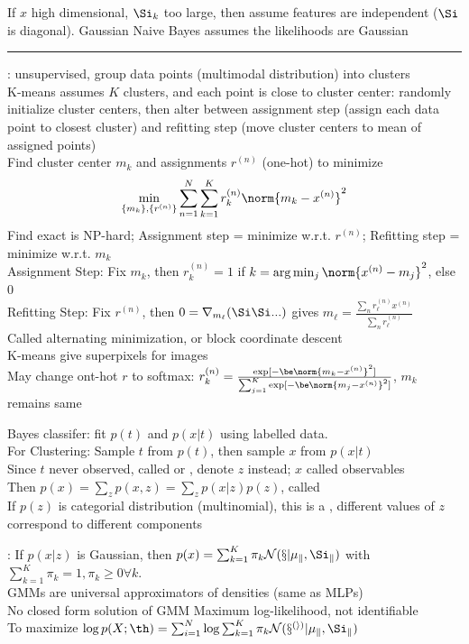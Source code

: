 \documentclass[10pt]{CheatSheet/hw}
\begin{document}
\begin{multicols*}{5}
If $x$ high dimensional, $\Si_k$ too large, then assume features are independent ($\Si$ is diagonal). Gaussian Naive Bayes assumes the likelihoods are Gaussian\\
\rule{\linewidth}{0.4pt}
: unsupervised, group data points (multimodal distribution) into clusters\\
K-means assumes $K$ clusters, and each point is close to cluster center: randomly initialize cluster centers, then alter between assignment step (assign each data point to closest cluster) and refitting step (move cluster centers to mean of assigned points)\\
Find cluster center $m_k$ and assignments $r^{(n)}$ (one-hot) to minimize $$\min_{\{m_k\}, \{r^{(n)}\}}\sum_{n=1}^N\sum_{k=1}^K r_k^{(n)}\norm{m_k-x^{(n)}}^2$$
Find exact is NP-hard; Assignment step = minimize w.r.t. $r^{(n)}$; Refitting step = minimize w.r.t. $m_k$\\
Assignment Step: Fix $m_k$, then
$r_k^{(n)}=1$ if $k=\arg\min_{j}\norm{x^{(n)}-m_{j}}^2$, else 0\\
Refitting Step: Fix $r^{(n)}$, then $0=\nabla_{m_\ell}(\Si\Si...)$ gives $m_\ell=\frac{\sum_{n}r_\ell^{(n)}x^{(n)}}{\sum_n r_\ell^{(n)}}$\\
Called alternating minimization, or block coordinate descent\\
K-means give superpixels for images\\
May change ont-hot $r$ to softmax: $r_k^{(n)}=\frac{\exp[-\be\norm{m_k-x^{(n)}}^2]}{\sum_{j=1}^K \exp[-\be\norm{m_j-x^{(n)}}^2]}$, $m_k$ remains same

Bayes classifer: fit $p(t)$ and $p(x|t)$ using labelled data.\\
For Clustering: Sample $t$ from $p(t)$, then sample $x$ from $p(x|t)$\\
Since $t$ never observed, called  or , denote $z$ instead; $x$ called observables\\
Then $p(x)=\sum_z p(x,z)=\sum_z p(x|z)p(z)$, called \\
If $p(z)$ is categorial distribution (multinomial), this is a , different values of $z$ correspond to different components

: If $p(x|z)$ is Gaussian, then $p(x)=\sum_{k=1}^K \pi_k\cal{N}(x|\mu_k,\Si_k)$ with $\sum_{k=1}^K \pi_k=1, \pi_k\ge 0 \forall k$.\\
GMMs are universal approximators of densities (same as MLPs)\\
No closed form solution of GMM Maximum log-likelihood, not identifiable\\
To maximize $\log p(X;\th)=\sum_{i=1}^N\log \sum_{k=1}^K \pi_k \cal{N}(x^{(i)}| \mu_k, \Si_k)$


\end{multicols*}
\end{document}
